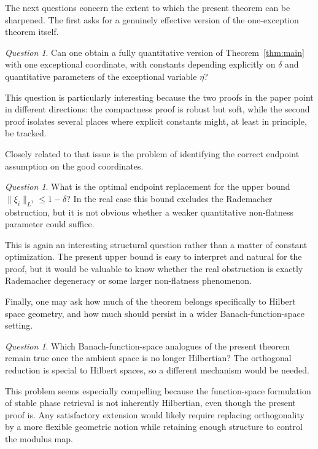 \documentclass[11pt]{amsart}
\numberwithin{equation}{section}
\theoremstyle{definition}
\theoremstyle{remark}
\newtheorem{question}[theorem]{Question}
\newcommand{\norm}[1]{\lVert #1 \rVert}
\begin{document}
The next questions concern the extent to which the present theorem can be
sharpened.  The first asks for a genuinely effective version of the one-exception
theorem itself.

\begin{question}
Can one obtain a fully quantitative version of Theorem~\ref{thm:main} with one
exceptional coordinate, with constants depending explicitly on
$\delta$ and quantitative parameters of the exceptional variable $\eta$?
\end{question}

This question is particularly interesting because the two proofs in the paper
point in different directions: the compactness proof is robust but soft, while
the second proof isolates several places where explicit constants might, at
least in principle, be tracked.

Closely related to that issue is the problem of identifying the correct endpoint
assumption on the good coordinates.

\begin{question}
What is the optimal endpoint replacement for the upper bound
$\norm{\xi_i}_{L^1}\le1-\delta$?  In the real case this bound excludes the
Rademacher obstruction, but it is not obvious whether a weaker quantitative
non-flatness parameter could suffice.
\end{question}

This is again an interesting structural question rather than a matter of
constant optimization.  The present upper bound is easy to interpret and
natural for the proof, but it would be valuable to know whether the real
obstruction is exactly Rademacher degeneracy or some larger non-flatness
phenomenon.

Finally, one may ask how much of the theorem belongs specifically to Hilbert
space geometry, and how much should persist in a wider Banach-function-space
setting.

\begin{question}
Which Banach-function-space analogues of the present theorem remain true once
the ambient space is no longer Hilbertian?  The orthogonal reduction is
special to Hilbert spaces, so a different mechanism would be needed.
\end{question}

This problem seems especially compelling because the function-space formulation
of stable phase retrieval is not inherently Hilbertian, even though the present
proof is.  Any satisfactory extension would likely require replacing
orthogonality by a more flexible geometric notion while retaining enough
structure to control the modulus map.
\end{document}
